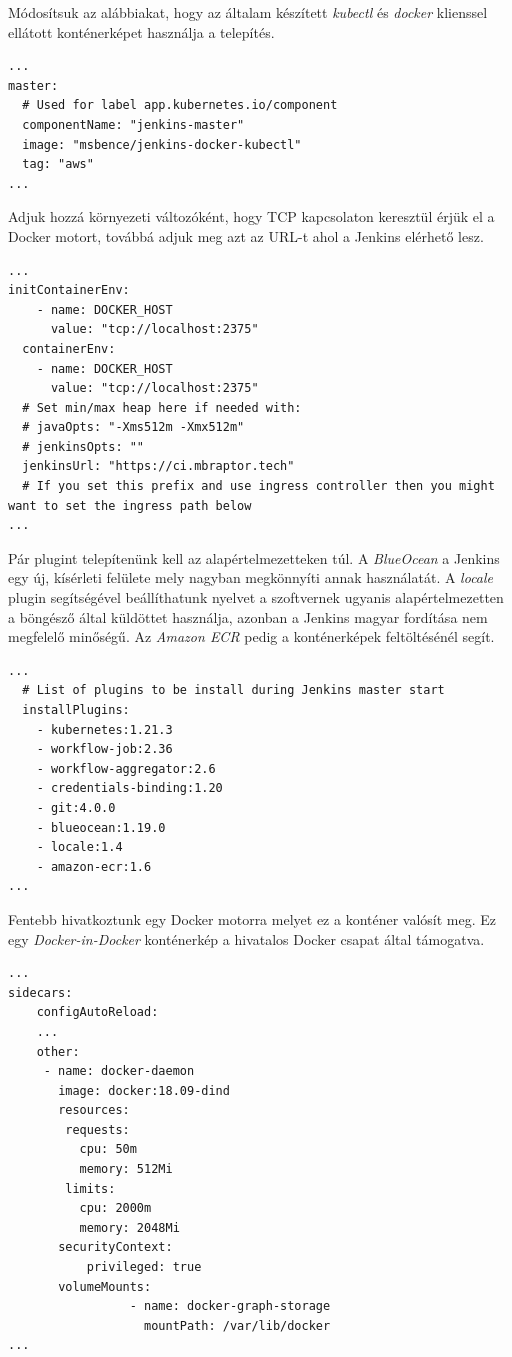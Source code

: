 Módosítsuk az alábbiakat, hogy az általam készített \textit{kubectl} és \textit{docker} klienssel ellátott konténerképet használja a telepítés.
\begin{lstlisting}
...
master:
  # Used for label app.kubernetes.io/component
  componentName: "jenkins-master"
  image: "msbence/jenkins-docker-kubectl"
  tag: "aws"
...
\end{lstlisting}
Adjuk hozzá környezeti változóként, hogy TCP kapcsolaton keresztül érjük el a Docker motort, továbbá adjuk meg azt az URL-t ahol a Jenkins elérhető lesz.
\begin{lstlisting}
...
initContainerEnv:
    - name: DOCKER_HOST
      value: "tcp://localhost:2375"
  containerEnv:
    - name: DOCKER_HOST
      value: "tcp://localhost:2375"
  # Set min/max heap here if needed with:
  # javaOpts: "-Xms512m -Xmx512m"
  # jenkinsOpts: ""
  jenkinsUrl: "https://ci.mbraptor.tech"
  # If you set this prefix and use ingress controller then you might want to set the ingress path below
...
\end{lstlisting}
Pár plugint telepítenünk kell az alapértelmezetteken túl. A \textit{BlueOcean} a Jenkins egy új, kísérleti felülete mely nagyban megkönnyíti annak használatát. A \textit{locale} plugin segítségével beállíthatunk nyelvet a szoftvernek ugyanis alapértelmezetten a böngésző által küldöttet használja, azonban a Jenkins magyar fordítása nem megfelelő minőségű. Az \textit{Amazon ECR} pedig a konténerképek feltöltésénél segít.
\begin{lstlisting}
...
  # List of plugins to be install during Jenkins master start
  installPlugins:
    - kubernetes:1.21.3
    - workflow-job:2.36
    - workflow-aggregator:2.6
    - credentials-binding:1.20
    - git:4.0.0
    - blueocean:1.19.0
    - locale:1.4
    - amazon-ecr:1.6
...
\end{lstlisting}
Fentebb hivatkoztunk egy Docker motorra melyet ez a konténer valósít meg. Ez egy \textit{Docker-in-Docker} konténerkép a hivatalos Docker csapat által támogatva.
\begin{lstlisting}
...
sidecars:
    configAutoReload:
    ...
    other:
     - name: docker-daemon
       image: docker:18.09-dind
       resources:
        requests:
          cpu: 50m
          memory: 512Mi
        limits:
          cpu: 2000m
          memory: 2048Mi
       securityContext:
           privileged: true
       volumeMounts:
                 - name: docker-graph-storage
                   mountPath: /var/lib/docker
...
\end{lstlisting}

